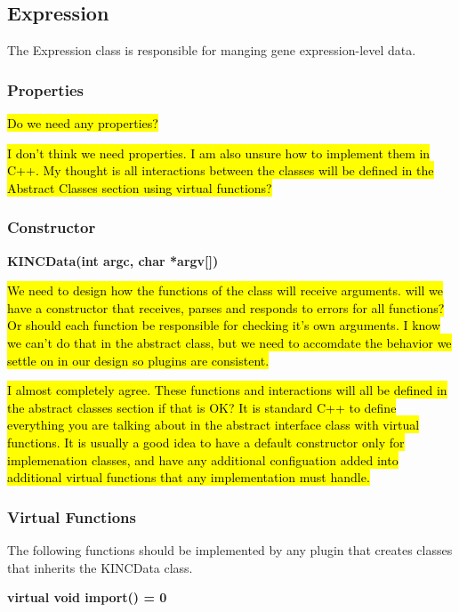 \documentclass[10pt]{article}
\providecommand{\stephen}[1]{\sethlcolor{lyellow}\hl{#1}}
\providecommand{\josh}[1]{\sethlcolor{lblue}\hl{#1}}
\begin{document}
\subsection{Expression}

The Expression class is responsible for manging gene expression-level data.  

\subsubsection{Properties}

\stephen{Do we need any properties?}

\josh{I don't think we need properties. I am also unsure how to implement them 
in C++. My thought is all interactions between the classes will be defined in 
the Abstract Classes section using virtual functions?}

\subsubsection{Constructor}

{\bfseries KINCData(int argc, char *argv[])}

\stephen{We need to design how the functions of the class will receive 
arguments.  will we have a constructor that receives, parses and responds to 
errors for all functions?  Or should each function be responsible for checking 
it's own arguments. I know we can't do that in the abstract class, but 
we need to accomdate the behavior we settle on in our design so plugins
are consistent.}

\josh{I almost completely agree. These functions and interactions will all be 
defined in the abstract classes section if that is OK? It is standard C++ to 
define everything you are talking about in the abstract interface class with 
virtual functions. It is usually a good idea to have a default constructor only 
for implemenation classes, and have any additional configuation added into 
additional virtual functions that any implementation must handle.}

\subsubsection{Virtual Functions}

The following functions should be implemented by any plugin that creates
classes that inherits the KINCData class.

{\bfseries virtual void import() = 0}
\end{document}
